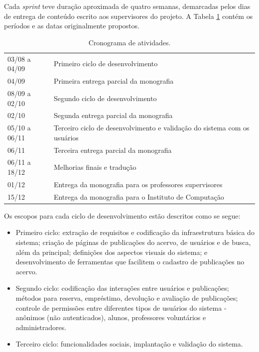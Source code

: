 \documentclass[a4paper]{article}
\begin{document}
Cada \textit{sprint} teve duração aproximada de quatro semanas, demarcadas pelos dias de entrega de conteúdo escrito aos supervisores do projeto. A Tabela \ref{cronograma} contém os períodos e as datas originalmente propostos.

\begin{table}[hc]
\centering
\caption{Cronograma de atividades.\label{cronograma}}
\begin{tabular}{ll}
\hline
03/08 a 04/09 & Primeiro ciclo de desenvolvimento \\
04/09 & Primeira entrega parcial da monografia \\
08/09 a 02/10 & Segundo ciclo de desenvolvimento \\
02/10 & Segunda entrega parcial da monografia \\
05/10 a 06/11 & Terceiro ciclo de desenvolvimento e validação do sistema com os usuários \\
06/11 & Terceira entrega parcial da monografia \\
06/11 a 18/12 & Melhorias finais e tradução\\
01/12 & Entrega da monografia para os professores supervisores\\
15/12 & Entrega da monografia para o Instituto de Computação\\
\hline
\end{tabular}
\end{table}

Os escopos para cada ciclo de desenvolvimento estão descritos como se segue:

\begin{itemize}
\item Primeiro ciclo: extração de requisitos e codificação da infraestrutura básica do sistema; criação de páginas de publicações do acervo, de usuários e de busca, além da principal; definições dos aspectos visuais do sistema; e desenvolvimento de ferramentas que facilitem o cadastro de publicações no acervo.
\item Segundo ciclo: codificação das interações entre usuários e publicações; métodos para reserva, empréstimo, devolução e avaliação de publicações; controle de permissões entre diferentes tipos de usuários do sistema - anônimos (não autenticados), alunos, professores voluntários e administradores.
\item Terceiro ciclo: funcionalidades sociais, implantação e validação do sistema.
\end{itemize}
\end{document}
